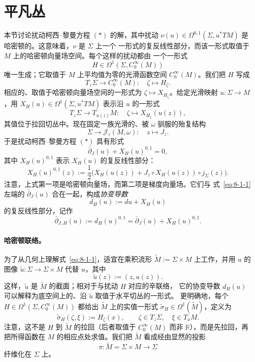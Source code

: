 \section{平凡丛}\label{sec:8-1}

本节讨论扰动柯西--黎曼方程 $(*)$ 的解，其中扰动
$\nu(u)\in\Omega^{0,1}(\Sigma,u^*TM)$ 是哈密顿的。这意味着，$\nu$ 是 $\Sigma$ 上一个
一形式的复反线性部分，而该一形式取值于 $M$ 上的哈密顿向量场空间。每个这样的扰动都由
一个一形式
\[
  H\in\Omega^1(\Sigma,C_0^\infty(M))
\]
唯一生成；它取值于 $M$ 上平均值为零的光滑函数空间 $C_0^\infty(M)$。我们把 $H$ 写成
\[
  T_z\Sigma\longrightarrow C_0^\infty(M):\quad
  \zeta\longmapsto H_\zeta.
\]
相应的、取值于哈密顿向量场空间的一形式为 $\zeta\mapsto X_{H_\zeta}$。给定光滑映射
$u:\Sigma\to M$，用 $X_H(u)\in\Omega^1(\Sigma,u^*TM)$ 表示沿 $u$ 的一形式
\[
  T_z\Sigma\longrightarrow T_{u(z)}M:\quad
  \zeta\longmapsto X_{H_\zeta}(u(z)),
\]
其值位于拉回切丛中。现在固定一族光滑的、被 $\omega$ 驯服的殆复结构
\[
  \Sigma\longrightarrow\mathcal J_\tau(M,\omega):\quad z\longmapsto J_z.
\]
于是扰动柯西--黎曼方程 $(*)$ 具有形式
\begin{equation}\label{eq:8-1-1}
  \bar\partial_J(u)+X_H(u)^{0,1}=0,
\end{equation}
其中 $X_H(u)^{0,1}$ 表示 $X_H(u)$ 的复反线性部分：
\[
  X_H(u)^{0,1}(z)
  :=\frac12\bigl(X_H(u(z))+J_z\circ X_H(u(z))\circ j_\Sigma(z)\bigr).
\]
注意，上式第一项是哈密顿向量场，而第二项是梯度向量场。它们与
式~\eqref{eq:8-1-1} 左端的 $\bar\partial_J(u)$ 合在一起，构成\emph{协变导数}
\[
  d_H(u):=du+X_H(u)
\]
的复反线性部分，记作
\[
  \bar\partial_{J,H}(u):=d_H(u)^{0,1}
  =\bar\partial_J(u)+X_H(u)^{0,1}.
\]

\paragraph{哈密顿联络。}
为了从几何上理解式~\eqref{eq:8-1-1}，适宜在乘积流形
$\widetilde M:=\Sigma\times M$ 上工作，并用 $u$ 的图像
$\widetilde u:\Sigma\to\Sigma\times M$ 代替 $u$，其中
\[
  \widetilde u(z):=(z,u(z)).
\]
这样，$\widetilde u$ 是 $\widetilde M$ 的截面；相对于与扰动 $H$ 对应的辛联络，
它的协变导数 $d_H(u)$ 可以解释为底空间上的、沿 $\widetilde u$ 取值于水平切丛的一形式。
更明确地，每个 $H\in\Omega^1(\Sigma,C_0^\infty(M))$ 都给出
$\widetilde M$ 上的实值一形式 $\widetilde\sigma_H\in\Omega^1(\widetilde M)$，定义为
\[
  \widetilde\sigma_H(\zeta,\xi):=H_\zeta(x),
  \qquad \zeta\in T_z\Sigma,\quad \xi\in T_xM.
\]
注意，这不是 $H$ 到 $\widetilde M$ 的拉回（后者取值于 $C_0^\infty(M)$ 而非
$\mathbb R$），而是先拉回，再把所得函数在 $M$ 的相应点处求值。我们把
$\widetilde M$ 看成经由显然的投影
\[
  \pi:\widetilde M=\Sigma\times M\longrightarrow\Sigma
\]
纤维化在 $\Sigma$ 上。

